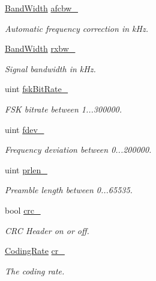 \begin{DoxyCompactItemize}
\hyperlink{classo_cpt_1_1_lo_ra_abb27d22a584625eea0339906152c031d}{Band\+Width} \hyperlink{classo_cpt_1_1_lo_ra_a776e20c9dbac73ba02dca35c63ee4807}{afcbw\+\_\+}
\begin{DoxyCompactList}\small\item\em Automatic frequency correction in k\+Hz. \end{DoxyCompactList}\item 
\hyperlink{classo_cpt_1_1_lo_ra_abb27d22a584625eea0339906152c031d}{Band\+Width} \hyperlink{classo_cpt_1_1_lo_ra_ad82916e0708ce81df40be3a264446c94}{rxbw\+\_\+}
\begin{DoxyCompactList}\small\item\em Signal bandwidth in k\+Hz. \end{DoxyCompactList}\item 
uint \hyperlink{classo_cpt_1_1_lo_ra_ae8fc701f0418461263bc0049e95ab01e}{fsk\+Bit\+Rate\+\_\+}
\begin{DoxyCompactList}\small\item\em F\+SK bitrate between 1...300000. \end{DoxyCompactList}\item 
uint \hyperlink{classo_cpt_1_1_lo_ra_ac0a2434f4fd5275771f56c810aa3fbed}{fdev\+\_\+}
\begin{DoxyCompactList}\small\item\em Frequency deviation between 0...200000. \end{DoxyCompactList}\item 
uint \hyperlink{classo_cpt_1_1_lo_ra_a93c4923a8c79b33788d998cca5b764f8}{prlen\+\_\+}
\begin{DoxyCompactList}\small\item\em Preamble length between 0...65535. \end{DoxyCompactList}\item 
bool \hyperlink{classo_cpt_1_1_lo_ra_af6a4412b761252d2ef9b55c22ad2ef8e}{crc\+\_\+}
\begin{DoxyCompactList}\small\item\em C\+RC Header on or off. \end{DoxyCompactList}\item 
\hyperlink{classo_cpt_1_1_lo_ra_a9bbdbc3b6fefdabd52bbb3ebbebcee7a}{Coding\+Rate} \hyperlink{classo_cpt_1_1_lo_ra_a61d7ff909c4e40b48a8722ec0e608b2a}{cr\+\_\+}
\begin{DoxyCompactList}\small\item\em The coding rate. \end{DoxyCompactList}\item 

\end{DoxyCompactItemize}
